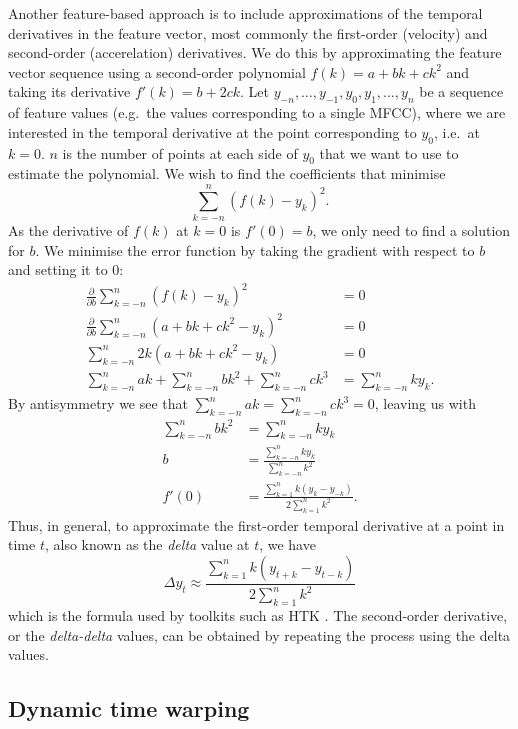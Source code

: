 Another feature-based approach is to include approximations of the temporal derivatives in the feature vector, most commonly the first-order (velocity) and second-order (accerelation) derivatives.
We do this by approximating the feature vector sequence using a second-order polynomial $f(k)=a + bk + ck^2$ and taking its derivative $f'(k)=b + 2ck$.
Let $y_{-n}, \dots, y_{-1}, y_0, y_1, \dots, y_n$ be a sequence of feature values (e.g.\ the values corresponding to a single MFCC), where we are interested in the temporal derivative at the point corresponding to $y_0$, i.e.\ at $k=0$.
$n$ is the number of points at each side of $y_0$ that we want to use to estimate the polynomial.
We wish to find the coefficients that minimise
\begin{equation}
\sum_{k=-n}^n (f(k) - y_k)^2.
\end{equation}
As the derivative of $f(k)$ at $k=0$ is $f'(0) = b$, we only need to find a solution for $b$.
We minimise the error function by taking the gradient with respect to $b$ and setting it to $0$:
\begin{align}
  \frac{\partial}{\partial b} \sum_{k=-n}^n (f(k) - y_k)^2 &= 0 \\
  \frac{\partial}{\partial b} \sum_{k=-n}^n (a + bk + ck^2 - y_k)^2 &= 0 \\
  \sum_{k=-n}^n 2k(a + bk + ck^2 - y_k) &= 0 \\
  \sum_{k=-n}^n ak + \sum_{k=-n}^n bk^2 + \sum_{k=-n}^n ck^3 &= \sum_{k=-n}^n ky_k.
\end{align}
By antisymmetry we see that $\sum_{k=-n}^n ak = \sum_{k=-n}^n ck^3 = 0$, leaving us with
\begin{align}
  \sum_{k=-n}^n bk^2 &= \sum_{k=-n}^n ky_k \\
  b &= \frac{\sum_{k=-n}^n ky_k}{\sum_{k=-n}^n k^2} \\
  f'(0) &= \frac{\sum_{k=1}^n k(y_k - y_{-k})}{2\sum_{k=1}^n k^2}.
\end{align}
Thus, in general, to approximate the first-order temporal derivative at a point in time $t$, also known as the \emph{delta} value at $t$, we have
\begin{equation}
\Delta y_t \approx \frac{\sum_{k=1}^n k(y_{t+k} - y_{t-k})}{2 \sum_{k=1}^n k^2}
\end{equation}
which is the formula used by toolkits such as HTK \parencite{young2005htk}.
The second-order derivative, or the \emph{delta-delta} values, can be obtained by repeating the process using the delta values.

\subsection{Dynamic time warping}

